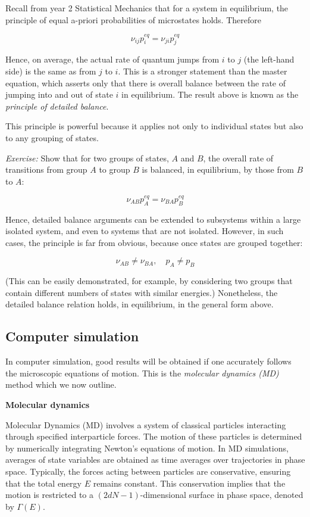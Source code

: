 \documentclass[
  letterpaper,
  enabledeprecatedfontcommands]{report}
\begin{document}
Recall from year 2 Statistical Mechanics that for a system in
equilibrium, the principle of equal a-priori probabilities of
microstates holds. Therefore

\[
\nu_{ij} p_i^{eq} = \nu_{ji} p_j^{eq}
\]

Hence, on average, the actual rate of quantum jumps from \(i\) to \(j\)
(the left-hand side) is the same as from \(j\) to \(i\). This is a
stronger statement than the master equation, which asserts only that
there is overall balance between the rate of jumping into and out of
state \(i\) in equilibrium. The result above is known as the
\emph{principle of detailed balance}.

This principle is powerful because it applies not only to individual
states but also to any grouping of states.

\emph{Exercise:} Show that for two groups of states, \(A\) and \(B\),
the overall rate of transitions from group \(A\) to group \(B\) is
balanced, in equilibrium, by those from \(B\) to \(A\):

\[
\nu_{AB} p_A^{eq} = \nu_{BA} p_B^{eq}
\]

Hence, detailed balance arguments can be extended to subsystems within a
large isolated system, and even to systems that are not isolated.
However, in such cases, the principle is far from obvious, because once
states are grouped together:

\[
\nu_{AB} \ne \nu_{BA}, \quad p_A \ne p_B
\]

(This can be easily demonstrated, for example, by considering two groups
that contain different numbers of states with similar energies.)
Nonetheless, the detailed balance relation holds, in equilibrium, in the
general form above.

\subsection{Computer simulation}\label{computer-simulation}

In computer simulation, good results will be obtained if one accurately
follows the microscopic equations of motion. This is the \emph{molecular
dynamics (MD)} method which we now outline.

\textbf{Molecular dynamics}

Molecular Dynamics (MD) involves a system of classical particles
interacting through specified interparticle forces. The motion of these
particles is determined by numerically integrating Newton's equations of
motion. In MD simulations, averages of state variables are obtained as
time averages over trajectories in phase space. Typically, the forces
acting between particles are conservative, ensuring that the total
energy \(E\) remains constant. This conservation implies that the motion
is restricted to a \((2dN - 1)\)-dimensional surface in phase space,
denoted by \(\Gamma(E)\).
\end{document}
